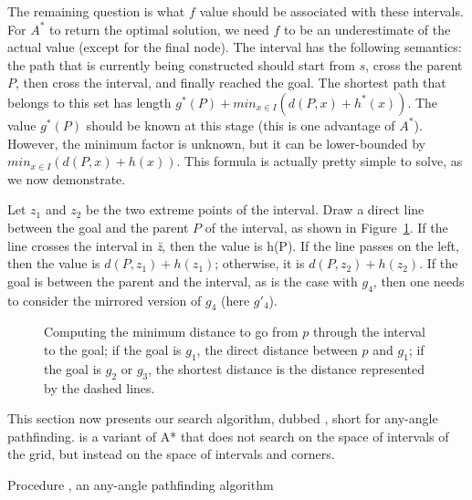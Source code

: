 The remaining question is what $f$ value 
should be associated with these intervals.  
For $A^*$ to return the optimal solution, 
we need $f$ to be an underestimate of the actual value 
(except for the final node).  
The interval has the following semantics: 
the path that is currently being constructed 
should start from $s$, cross the parent $P$, 
then cross the interval, and finally reached the goal.  
The shortest path that belongs to this set 
has length $g^*(P) + min_{x \in I}(d(P,x) + h^*(x))$.  
The value $g^*(P)$ should be known at this stage 
(this is one advantage of $A^*$).  
However, the minimum factor is unknown, 
but it can be lower-bounded by $min_{x \in I}(d(P,x) + h(x))$.  
This formula is actually pretty simple to solve, as we now demonstrate.  

Let $z_1$ and $z_2$ be the two extreme points of the interval.  
Draw a direct line between the goal and the parent $P$ of the interval, 
as shown in Figure~\ref{fig::fvalue}.  
If the line crosses the interval in \textit{\u z}, then the value is h(P).  If the line passes on the left, 
then the value is $d(P,z_1)+h(z_1)$; 
otherwise, it is $d(P,z_2)+h(z_2)$.  
If the goal is between the parent and the interval, 
as is the case with $g_4$, 
then one needs to consider the mirrored version of $g_4$ 
(here $g'_4$).  

\begin{figure}[ht]
  \begin{center}
    
  \end{center}
  \caption{Computing the minimum distance 
    to go from $p$ through the interval to the goal; 
    if the goal is $g_1$, the direct distance between $p$ and $g_1$; 
    if the goal is $g_2$ or $g_3$, 
    the shortest distance is the distance represented by the dashed lines.}
  \label{fig::fvalue}
\end{figure}

This section now presents our search algorithm, dubbed \anya, short for
any-angle pathfinding.  \anya{} is a variant of A* that does not search on the
space of intervals of the grid, but instead on the space of intervals and
corners.

\begin{algorithm}[ht!]
  
  \caption{Procedure \anya, an any-angle pathfinding algorithm}
  \label{algo::anya}
\end{algorithm}

